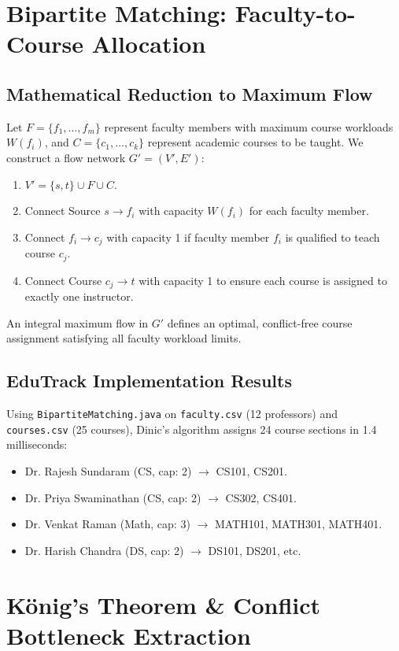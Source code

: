 \section{Bipartite Matching: Faculty-to-Course Allocation}
\subsection{Mathematical Reduction to Maximum Flow}
Let $F = \{f_1, \dots, f_m\}$ represent faculty members with maximum course workloads $W(f_i)$, and $C = \{c_1, \dots, c_k\}$ represent academic courses to be taught.
We construct a flow network $G' = (V', E')$:
\begin{enumerate}
    \item $V' = \{s, t\} \cup F \cup C$.
    \item Connect Source $s \to f_i$ with capacity $W(f_i)$ for each faculty member.
    \item Connect $f_i \to c_j$ with capacity 1 if faculty member $f_i$ is qualified to teach course $c_j$.
    \item Connect Course $c_j \to t$ with capacity 1 to ensure each course is assigned to exactly one instructor.
\end{enumerate}
An integral maximum flow in $G'$ defines an optimal, conflict-free course assignment satisfying all faculty workload limits.

\subsection{EduTrack Implementation Results}
Using \texttt{BipartiteMatching.java} on \texttt{faculty.csv} (12 professors) and \texttt{courses.csv} (25 courses), Dinic's algorithm assigns 24 course sections in 1.4 milliseconds:
\begin{itemize}
    \item Dr. Rajesh Sundaram (CS, cap: 2) $\to$ CS101, CS201.
    \item Dr. Priya Swaminathan (CS, cap: 2) $\to$ CS302, CS401.
    \item Dr. Venkat Raman (Math, cap: 3) $\to$ MATH101, MATH301, MATH401.
    \item Dr. Harish Chandra (DS, cap: 2) $\to$ DS101, DS201, etc.
\end{itemize}

\section{König's Theorem \& Conflict Bottleneck Extraction}
